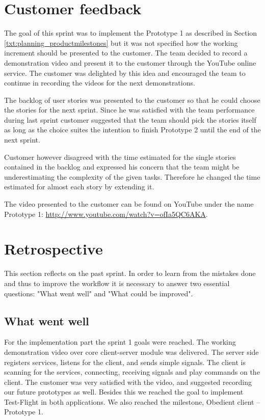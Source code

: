 \section{Customer feedback}
The goal of this sprint was to implement the Prototype 1 as described in Section \ref{txt:planning_productmilestones} but it was not specified how the working increment should be presented to the customer. The team decided to record a demonstration video and present it to the customer through the YouTube online service. The customer was delighted by this idea and encouraged the team to continue in recording the videos for the next demonstrations.

The backlog of user stories was presented to the customer so that he could choose the stories for the next sprint. Since he was satisfied with the team performance during last sprint customer suggested that the team should pick the stories itself as long as the choice suites the intention to finish Prototype 2 until the end of the next sprint.

Customer however disagreed with the time estimated for the single stories contained in the backlog and expressed his concern that the team might be underestimating the complexity of the given tasks. Therefore he changed the time estimated for almost each story by extending it.

The video presented to the customer can be found on YouTube under the name Prototype 1: \url{http://www.youtube.com/watch?v=ofIa5QC6AKA}.

\section{Retrospective}
This section reflects on the past sprint. In order to learn from the mistakes done and thus to improve the workflow it is necessary to answer two essential questions: "What went well" and "What could be improved".

\subsection{What went well}
For the implementation part the sprint 1 goals were reached. The working demonstration video over core client-server module was delivered. The server side registers services, listens for the client, and sends simple  signals. The client is scanning for the services, connecting, receiving signals and play commands on the client. The customer was very satisfied with the video, and suggested recording our future prototypes as well. Besides this we reached the goal to implement Test-Flight in both applications. We also reached the milestone, Obedient client -- Prototype 1.

